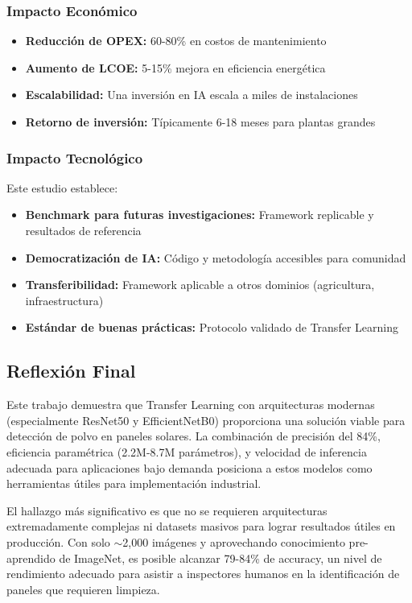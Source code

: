 \documentclass[11pt, a4paper]{article}
\begin{document}
\subsubsection{Impacto Económico}

\begin{itemize}
    \item \textbf{Reducción de OPEX:} 60-80\% en costos de mantenimiento
    \item \textbf{Aumento de LCOE:} 5-15\% mejora en eficiencia energética
    \item \textbf{Escalabilidad:} Una inversión en IA escala a miles de instalaciones
    \item \textbf{Retorno de inversión:} Típicamente 6-18 meses para plantas grandes
\end{itemize}

\subsubsection{Impacto Tecnológico}

Este estudio establece:

\begin{itemize}
    \item \textbf{Benchmark para futuras investigaciones:} Framework replicable y resultados de referencia
    \item \textbf{Democratización de IA:} Código y metodología accesibles para comunidad
    \item \textbf{Transferibilidad:} Framework aplicable a otros dominios (agricultura, infraestructura)
    \item \textbf{Estándar de buenas prácticas:} Protocolo validado de Transfer Learning
\end{itemize}

\subsection{Reflexión Final}

Este trabajo demuestra que Transfer Learning con arquitecturas modernas (especialmente ResNet50 y EfficientNetB0) proporciona una solución viable para detección de polvo en paneles solares. La combinación de precisión del 84\%, eficiencia paramétrica (2.2M-8.7M parámetros), y velocidad de inferencia adecuada para aplicaciones bajo demanda posiciona a estos modelos como herramientas útiles para implementación industrial.

El hallazgo más significativo es que no se requieren arquitecturas extremadamente complejas ni datasets masivos para lograr resultados útiles en producción. Con solo $\sim$2,000 imágenes y aprovechando conocimiento pre-aprendido de ImageNet, es posible alcanzar 79-84\% de accuracy, un nivel de rendimiento adecuado para asistir a inspectores humanos en la identificación de paneles que requieren limpieza.
\end{document}
